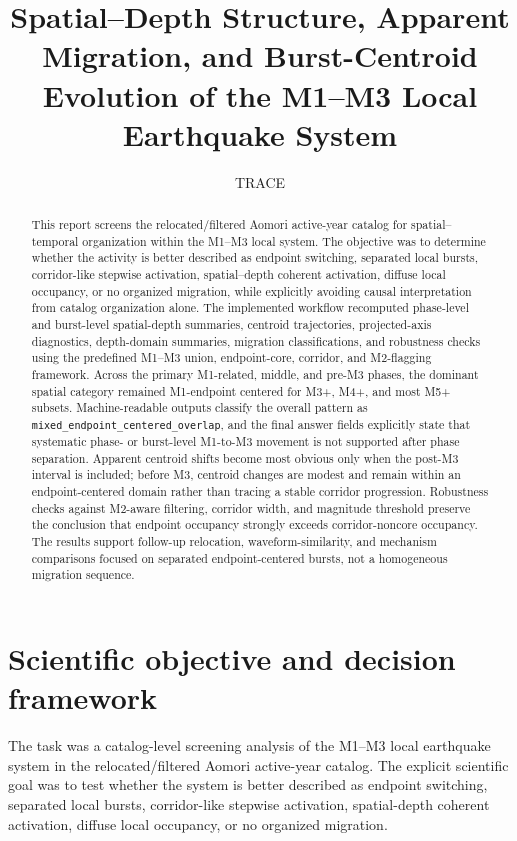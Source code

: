 \documentclass[11pt]{article}
\title{Spatial--Depth Structure, Apparent Migration, and Burst-Centroid Evolution of the M1--M3 Local Earthquake System}
\author{TRACE}
\date{}
\begin{document}
\maketitle

\begin{abstract}
This report screens the relocated/filtered Aomori active-year catalog for spatial--temporal organization within the M1--M3 local system. The objective was to determine whether the activity is better described as endpoint switching, separated local bursts, corridor-like stepwise activation, spatial--depth coherent activation, diffuse local occupancy, or no organized migration, while explicitly avoiding causal interpretation from catalog organization alone. The implemented workflow recomputed phase-level and burst-level spatial-depth summaries, centroid trajectories, projected-axis diagnostics, depth-domain summaries, migration classifications, and robustness checks using the predefined M1--M3 union, endpoint-core, corridor, and M2-flagging framework. Across the primary M1-related, middle, and pre-M3 phases, the dominant spatial category remained M1-endpoint centered for M3+, M4+, and most M5+ subsets. Machine-readable outputs classify the overall pattern as \texttt{mixed\_endpoint\_centered\_overlap}, and the final answer fields explicitly state that systematic phase- or burst-level M1-to-M3 movement is not supported after phase separation. Apparent centroid shifts become most obvious only when the post-M3 interval is included; before M3, centroid changes are modest and remain within an endpoint-centered domain rather than tracing a stable corridor progression. Robustness checks against M2-aware filtering, corridor width, and magnitude threshold preserve the conclusion that endpoint occupancy strongly exceeds corridor-noncore occupancy. The results support follow-up relocation, waveform-similarity, and mechanism comparisons focused on separated endpoint-centered bursts, not a homogeneous migration sequence.
\end{abstract}

\section{Scientific objective and decision framework}
The task was a catalog-level screening analysis of the M1--M3 local earthquake system in the relocated/filtered Aomori active-year catalog. The explicit scientific goal was to test whether the system is better described as endpoint switching, separated local bursts, corridor-like stepwise activation, spatial-depth coherent activation, diffuse local occupancy, or no organized migration.
\end{document}

